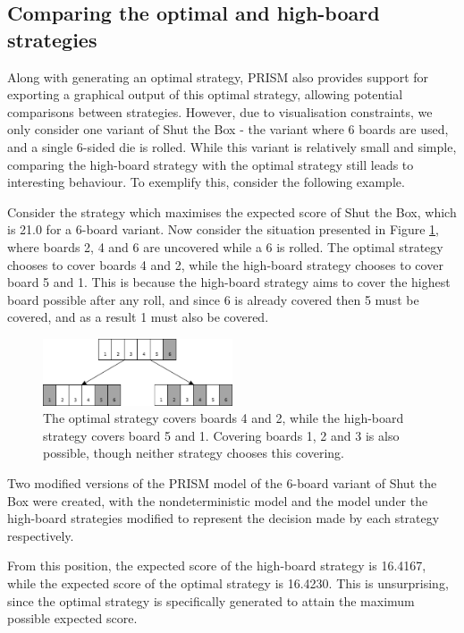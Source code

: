 \subsection{Comparing the optimal and high-board strategies}
\label{cs1:compare-strats}
Along with generating an optimal strategy, PRISM also provides support for exporting a graphical output of this optimal strategy, allowing potential comparisons between strategies. However, due to visualisation constraints, we only consider one variant of Shut the Box - the variant where 6 boards are used, and a single 6-sided die is rolled. While this variant is relatively small and simple, comparing the high-board strategy with the optimal strategy still leads to interesting behaviour. To exemplify this, consider the following example.

\begin{example}
\label{cs1:greedy-optimal}

Consider the strategy which maximises the expected score of Shut the Box, which is 21.0 for a 6-board variant. Now consider the situation presented in Figure \ref{cs1:optimal_high_board}, where boards 2, 4 and 6 are uncovered while a 6 is rolled. The optimal strategy chooses to cover boards 4 and 2, while the high-board strategy chooses to cover board 5 and 1. This is because the high-board strategy aims to cover the highest board possible after any roll, and since 6 is already covered then 5 must be covered, and as a result 1 must also be covered.

\begin{figure}
    \centering
    \includegraphics[width=0.5\textwidth]{images/ShutTheBox/optimal_high_board.pdf}
    \caption{The optimal strategy covers boards 4 and 2, while the high-board strategy covers board 5 and 1. Covering boards 1, 2 and 3 is also possible, though neither strategy chooses this covering.}
\label{cs1:optimal_high_board}
\end{figure}

Two modified versions of the PRISM model of the 6-board variant of Shut the Box were created, with the nondeterministic model and the model under the high-board strategies modified to represent the decision made by each strategy respectively.

From this position, the expected score of the high-board strategy is 16.4167, while the expected score of the optimal strategy is 16.4230. This is unsurprising, since the optimal strategy is specifically generated to attain the maximum possible expected score.


\end{example}
